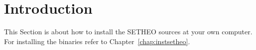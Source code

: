 %
\section{Introduction}

This Section is about how to install the SETHEO sources at your own
computer. For installing the binaries refer to
Chapter~\ref{chap:instsetheo}.
